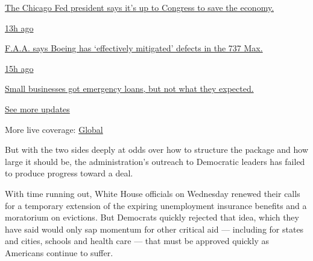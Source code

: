 \href{https://www.nytimes.com/live/2020/08/03/business/stock-market-today-coronavirus?action=click\&pgtype=Article\&state=default\&region=MAIN_CONTENT_1\&context=storylines_live_updates\#the-chicago-fed-president-says-its-up-to-congress-to-save-the-economy}{The
Chicago Fed president says it's up to Congress to save the economy.}

\href{https://www.nytimes.com/live/2020/08/03/business/stock-market-today-coronavirus?action=click\&pgtype=Article\&state=default\&region=MAIN_CONTENT_1\&context=storylines_live_updates\#faa-says-boeing-has-effectively-mitigated-defects-in-the-737-max}{13h
ago}

\href{https://www.nytimes.com/live/2020/08/03/business/stock-market-today-coronavirus?action=click\&pgtype=Article\&state=default\&region=MAIN_CONTENT_1\&context=storylines_live_updates\#faa-says-boeing-has-effectively-mitigated-defects-in-the-737-max}{F.A.A.
says Boeing has `effectively mitigated' defects in the 737 Max.}

\href{https://www.nytimes.com/live/2020/08/03/business/stock-market-today-coronavirus?action=click\&pgtype=Article\&state=default\&region=MAIN_CONTENT_1\&context=storylines_live_updates\#small-businesses-got-emergency-loans-but-not-what-they-expected}{15h
ago}

\href{https://www.nytimes.com/live/2020/08/03/business/stock-market-today-coronavirus?action=click\&pgtype=Article\&state=default\&region=MAIN_CONTENT_1\&context=storylines_live_updates\#small-businesses-got-emergency-loans-but-not-what-they-expected}{Small
businesses got emergency loans, but not what they expected.}

\href{https://www.nytimes.com/live/2020/08/03/business/stock-market-today-coronavirus?action=click\&pgtype=Article\&state=default\&region=MAIN_CONTENT_1\&context=storylines_live_updates}{See
more updates}

More live coverage:
\href{https://www.nytimes.com/2020/08/03/world/coronavirus-covid-19.html?action=click\&pgtype=Article\&state=default\&region=MAIN_CONTENT_1\&context=storylines_live_updates}{Global}

But with the two sides deeply at odds over how to structure the package
and how large it should be, the administration's outreach to Democratic
leaders has failed to produce progress toward a deal.

With time running out, White House officials on Wednesday renewed their
calls for a temporary extension of the expiring unemployment insurance
benefits and a moratorium on evictions. But Democrats quickly rejected
that idea, which they have said would only sap momentum for other
critical aid --- including for states and cities, schools and health
care --- that must be approved quickly as Americans continue to suffer.

